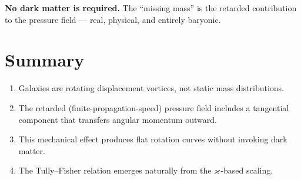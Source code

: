 \textbf{No dark matter is required.}  The ``missing mass'' is the retarded contribution to the pressure field --- real, physical, and entirely baryonic.


\section{Summary}

\begin{enumerate}
  \item Galaxies are rotating displacement vortices, not static mass distributions.
  \item The retarded (finite-propagation-speed) pressure field includes a tangential component that transfers angular momentum outward.
  \item This mechanical effect produces flat rotation curves without invoking dark matter.
  \item The Tully--Fisher relation emerges naturally from the $\varkappa$-based scaling.
\end{enumerate}
